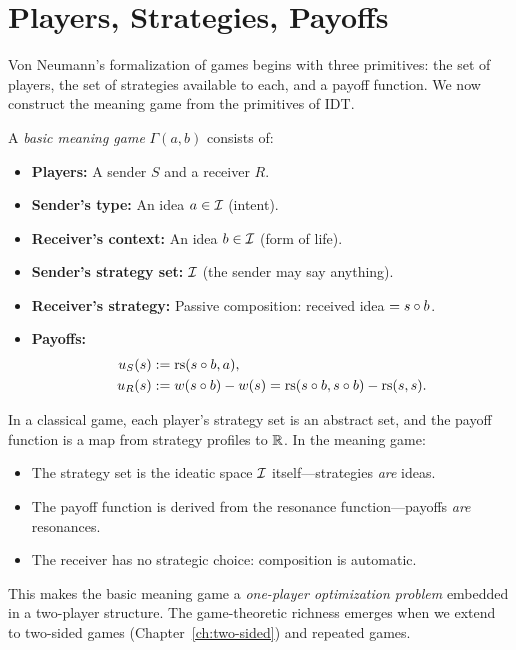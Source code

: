 \section{Players, Strategies, Payoffs}

Von Neumann's formalization of games begins with three primitives: the set of
players, the set of strategies available to each, and a payoff function.
We now construct the meaning game from the primitives of IDT.

\begin{definition}
\label{def:basic-meaning-game}
A \emph{basic meaning game} $\Gamma(a, b)$ consists of:
\begin{itemize}
\item \textbf{Players:} A sender $S$ and a receiver $R$.
\item \textbf{Sender's type:} An idea $a \in \mathcal{I}$ (intent).
\item \textbf{Receiver's context:} An idea $b \in \mathcal{I}$ (form of life).
\item \textbf{Sender's strategy set:} $\mathcal{I}$ (the sender may say anything).
\item \textbf{Receiver's strategy:} Passive composition: received idea $= s \circ b$.
\item \textbf{Payoffs:}
\begin{align}
u_S(s) &:= \mathrm{rs}(s \circ b, a), \label{eq:sender-payoff} \\
u_R(s) &:= w(s \circ b) - w(s) = \mathrm{rs}(s \circ b, s \circ b) - \mathrm{rs}(s, s). \label{eq:receiver-payoff}
\end{align}
\end{itemize}
\end{definition}

\begin{remark}
In a classical game, each player's strategy set is an abstract set, and
the payoff function is a map from strategy profiles to $\mathbb{R}$. In the meaning
game:
\begin{itemize}
\item The strategy set is the ideatic space $\mathcal{I}$ itself---strategies
\emph{are} ideas.
\item The payoff function is derived from the resonance function---payoffs
\emph{are} resonances.
\item The receiver has no strategic choice: composition is automatic.
\end{itemize}
This makes the basic meaning game a \emph{one-player optimization problem}
embedded in a two-player structure. The game-theoretic richness emerges when
we extend to two-sided games (Chapter~\ref{ch:two-sided}) and repeated games.
\end{remark}

